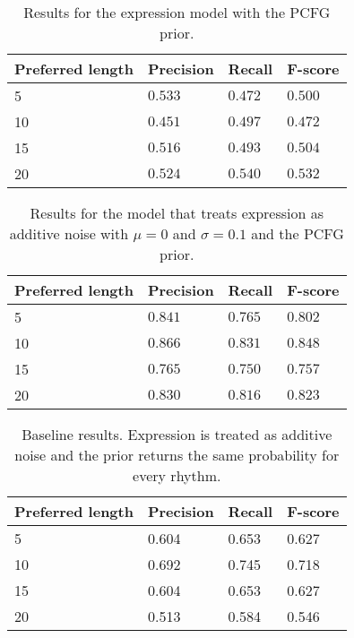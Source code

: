 \begin{table}
\centering
\caption{Results for the expression model with the PCFG prior.}
\label{tab:results1}
\begin{tabular}{llll}
\hline
\textbf{Preferred length} & \textbf{Precision} & \textbf{Recall} & \textbf{F-score}\\
\hline
\hline
5 & $0.533$ & $0.472$ & $0.500$\\
10 & $0.451$ & $0.497$ & $0.472$\\
15 & $0.516$ & $0.493$ & $0.504$\\
20 & $0.524$ & $0.540$ & $0.532$\\
\hline
\end{tabular}
\end{table}

\begin{table}
\centering
\caption{Results for the model that treats expression as additive noise with $\mu = 0$ and $\sigma = 0.1$ and the PCFG prior.}
\label{tab:results2}
\begin{tabular}{llll}
\hline
\textbf{Preferred length} & \textbf{Precision} & \textbf{Recall} & \textbf{F-score}\\
\hline
\hline
5 & $0.841$ & $0.765$ & $0.802$\\
10 & $0.866$ & $0.831$ & $0.848$\\
15 & $0.765$ & $0.750$ & $0.757$\\
20 & $0.830$ & $0.816$ & $0.823$\\
\hline
\end{tabular}
\end{table}

\begin{table}
\centering
\caption{Baseline results. Expression is treated as additive noise and the prior returns the same probability for every rhythm.}
\label{tab:results3}
\begin{tabular}{llll}
\hline
\textbf{Preferred length} & \textbf{Precision} & \textbf{Recall} & \textbf{F-score}\\
\hline
\hline
5 & 0.604 & 0.653 & 0.627\\
10 & 0.692 & 0.745 & 0.718\\
15 & 0.604 & 0.653 & 0.627\\
20 & 0.513 & 0.584 & 0.546\\
\end{tabular}
\end{table}